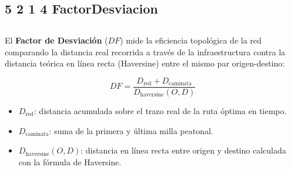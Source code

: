 \begin{figure}[H]
    \centering
    \caption[Cartografía de presentación — Fuerza Capilar y nodos \textit{hub} principales]{
    \zmvm{}}
    \label{fig:mapa-fc-presentacion}
\end{figure}
 \DIFaddend

\subsection*{5 2 1 4 FactorDesviacion}
\subsection{}
\label{subsec:detour-factor}

El \textbf{Factor de Desviación} ($DF$) mide la eficiencia topológica de la
red comparando la distancia real recorrida a través de la infraestructura
contra la distancia teórica en línea recta (Haversine) entre el mismo par
origen-destino:

\begin{equation}
    DF = \frac{D_{\text{red}} + D_{\text{caminata}}}{D_{\text{haversine}}(O, D)}
    \label{eq:detour-factor-res}
\end{equation}

\begin{itemize}
    \item $D_{\text{red}}$: distancia acumulada sobre el trazo real de la ruta
    óptima en tiempo.
    \item $D_{\text{caminata}}$: suma de la primera y última milla peatonal.
    \item $D_{\text{haversine}}(O,D)$: distancia en línea recta entre origen y
    destino calculada con la fórmula de Haversine.
\end{itemize}

